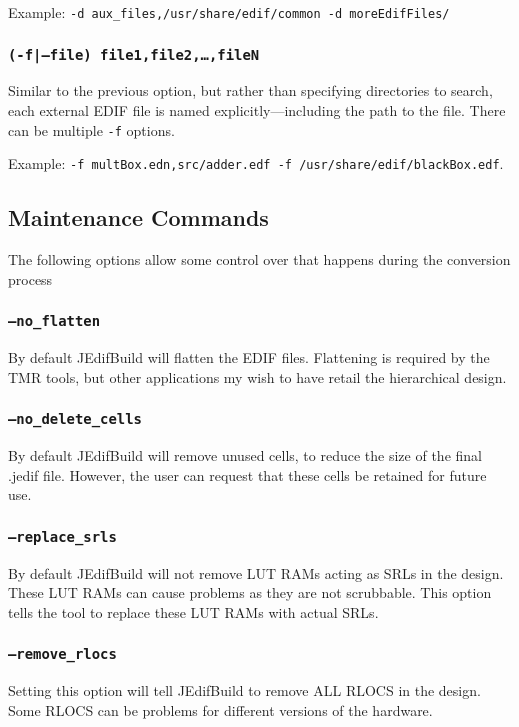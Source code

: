 Example: \texttt{-d aux\_files,/usr/share/edif/common -d moreEdifFiles/}

\subsubsection{\texttt{(-f|--file) file1,file2,\ldots,fileN}}
Similar to the previous option, but rather than specifying directories to 
search, each external EDIF file is named explicitly---including the path to the 
file. There can be multiple \texttt{-f} options. 

Example: \texttt{-f multBox.edn,src/adder.edf -f /usr/share/edif/blackBox.edf}.

\subsection{Maintenance Commands}
The following options allow some control over that happens during the 
conversion process

\subsubsection{\texttt{--no\_flatten}}
By default JEdifBuild will flatten the EDIF files. Flattening is required by the 
TMR tools, but other applications my wish to have retail the hierarchical design.

\subsubsection{\texttt{--no\_delete\_cells}}
By default JEdifBuild will remove unused cells, to reduce the size of the final
.jedif file. However, the user can request that these cells be retained for 
future use.

\subsubsection{\texttt{--replace\_srls}}
By default JEdifBuild will not remove LUT RAMs acting as SRLs in the design.  These
LUT RAMs can cause problems as they are not scrubbable.  This option tells the 
tool to replace these LUT RAMs with actual SRLs.

\subsubsection{\texttt{--remove\_rlocs}}
Setting this option will tell JEdifBuild to remove ALL RLOCS in the design.  Some
RLOCS can be problems for different versions of the hardware.

%
%



